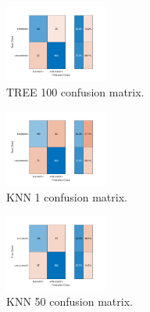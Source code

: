\clearpage 

\begin{figure}[htbp!]
  \centerline{\includegraphics[width=0.3\textwidth]{../../code/hw3/matlab/figures/TREE_100_confusion.pdf}}
  \caption{TREE 100 confusion matrix.}
  \label{fig:TREE_100_confusion}
\end{figure}

\begin{figure}[htbp!]
  \centerline{\includegraphics[width=0.3\textwidth]{../../code/hw3/matlab/figures/KNN_1_confusion.pdf}}
  \caption{KNN 1 confusion matrix.}
  \label{fig:KNN_1_confusion}
\end{figure}


\begin{figure}[htbp!]
  \centerline{\includegraphics[width=0.3\textwidth]{../../code/hw3/matlab/figures/KNN_50_confusion.pdf}}
  \caption{KNN 50 confusion matrix.}
  \label{fig:KNN_50_confusion}
\end{figure}
